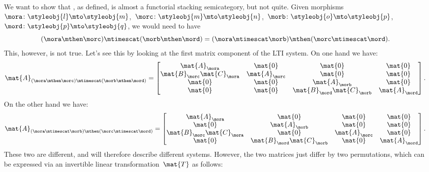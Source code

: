 \begin{example}
    We want to show that \LTI, as defined, is almost a functorial stacking semicategory, but not quite.
    Given morphisms~$\mora\colon \styleobj{l}\mto \styleobj{m}$,~$\morc\colon \styleobj{m}\mto \styleobj{n}$,~$\morb\colon \styleobj{o}\mto \styleobj{p}$,~$\mord\colon \styleobj{p}\mto \styleobj{q}$, we would need to have
    \begin{equation}
        (\mora \mthen \morc)
        \mtimescat (\morb\mthen \mord)=(\mora\mtimescat \morb)\mthen (\morc\mtimescat \mord).
    \end{equation}
    This, however, is not true.
    Let's see this by looking at the first matrix component of the LTI system.
    On one hand we have:
    \begin{equation}
        \mat{A}_{(\mora \mthen \morc)\mtimescat (\morb\mthen \mord)}=
        \begin{bmatrix}
            \mat{A}_\mora              & \mat{0}       & \mat{0}                    & \mat{0}       \\
            \mat{B}_\morc\mat{C}_\mora & \mat{A}_\morc & \mat{0}                    & \mat{0}       \\
            \mat{0}                    & \mat{0}       & \mat{A}_\morb              & \mat{0}       \\
            \mat{0}                    & \mat{0}       & \mat{B}_\mord\mat{C}_\morb & \mat{A}_\mord
        \end{bmatrix}.
    \end{equation}
    On the other hand we have:
    \begin{equation}
        \mat{A}_{(\mora\mtimescat \morb)\mthen (\morc\mtimescat \mord)}=
        \begin{bmatrix}
            \mat{A}_\mora               & \mat{0}                     & \mat{0}       & \mat{0}       \\
            \mat{0}                     & \mat{A}_\morb               & \mat{0}       & \mat{0}       \\
            \mat{B}_\morc \mat{C}_\mora & \mat{0}                     & \mat{A}_\morc & \mat{0}       \\
            \mat{0}                     & \mat{B}_\mord \mat{C}_\morb & \mat{0}       & \mat{A}_\mord
        \end{bmatrix}.
    \end{equation}
    These two are different, and will therefore describe different systems.
    However, the two matrices just differ by two permutations, which can be expressed via an invertible linear transformation~$\mat{T}$ as follows:

\end{example}
